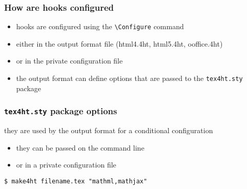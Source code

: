 
\begin{frame}
  \frametitle{How are hooks configured}
  \begin{itemize}
    \item hooks are configured using the \texttt{\textbackslash Configure} command
    \item either in the output format file (html4.4ht, html5.4ht, ooffice.4ht)
    \item or in the private configuration file
    \item the output format can define options that are passed to the \texttt{tex4ht.sty} package

\end{itemize}
\end{frame}

\begin{frame}[fragile]
  \frametitle{\texttt{tex4ht.sty} package options}
    they are used by the output format for a conditional configuration

  \begin{itemize}
    \item they can be passed on the command line
    \item or in a private configuration file 
  \end{itemize}
  \begin{priklad}
\begin{verbatim}
$ make4ht filename.tex "mathml,mathjax"
\end{verbatim}
\end{priklad}
\end{frame}
